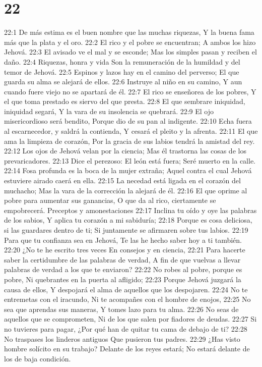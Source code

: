 \chapter{22}


22:1 De más estima es el buen nombre que las muchas riquezas,  
Y la buena fama más que la plata y el oro.  
22:2 El rico y el pobre se encuentran;  
A ambos los hizo Jehová.  
22:3 El avisado ve el mal y se esconde;  
Mas los simples pasan y reciben el daño.  
22:4 Riquezas, honra y vida  
Son la remuneración de la humildad y del temor de Jehová.  
22:5 Espinos y lazos hay en el camino del perverso;  
El que guarda su alma se alejará de ellos.  
22:6 Instruye al niño en su camino,  
Y aun cuando fuere viejo no se apartará de él.  
22:7 El rico se enseñorea de los pobres,  
Y el que toma prestado es siervo del que presta.  
22:8 El que sembrare iniquidad, iniquidad segará,  
Y la vara de su insolencia se quebrará.  
22:9 El ojo misericordioso será bendito,  
Porque dio de su pan al indigente.  
22:10 Echa fuera al escarnecedor, y saldrá la contienda,  
Y cesará el pleito y la afrenta.  
22:11 El que ama la limpieza de corazón,  
Por la gracia de sus labios tendrá la amistad del rey.  
22:12 Los ojos de Jehová velan por la ciencia;  
Mas él trastorna las cosas de los prevaricadores.  
22:13 Dice el perezoso: El león está fuera;  
Seré muerto en la calle.  
22:14 Fosa profunda es la boca de la mujer extraña;  
Aquel contra el cual Jehová estuviere airado caerá en ella.  
22:15 La necedad está ligada en el corazón del muchacho;  
Mas la vara de la corrección la alejará de él.  
22:16 El que oprime al pobre para aumentar sus ganancias, 
O que da al rico, ciertamente se empobrecerá.  
Preceptos y amonestaciones  
22:17 Inclina tu oído y oye las palabras de los sabios,  
Y aplica tu corazón a mi sabiduría;  
22:18 Porque es cosa deliciosa, si las guardares dentro de ti;  
Si juntamente se afirmaren sobre tus labios.  
22:19 Para que tu confianza sea en Jehová,  
Te las he hecho saber hoy a ti también.  
22:20 ¿No te he escrito tres veces  
En consejos y en ciencia,  
22:21 Para hacerte saber la certidumbre de las palabras de verdad,  
A fin de que vuelvas a llevar palabras de verdad a los que te enviaron?  
22:22 No robes al pobre, porque es pobre,  
Ni quebrantes en la puerta al afligido;  
22:23 Porque Jehová juzgará la causa de ellos,  
Y despojará el alma de aquellos que los despojaren.  
22:24 No te entremetas con el iracundo,  
Ni te acompañes con el hombre de enojos,  
22:25 No sea que aprendas sus maneras,  
Y tomes lazo para tu alma.  
22:26 No seas de aquellos que se comprometen,  
Ni de los que salen por fiadores de deudas.  
22:27 Si no tuvieres para pagar,  
¿Por qué han de quitar tu cama de debajo de ti?  
22:28 No traspases los linderos antiguos  
Que pusieron tus padres.  
22:29 ¿Has visto hombre solícito en su trabajo? Delante de los reyes estará;  
No estará delante de los de baja condición.  


